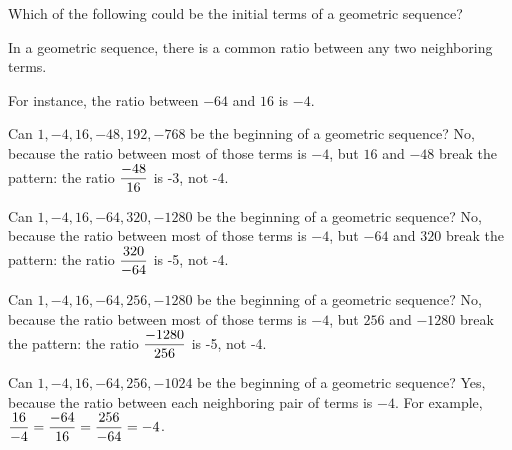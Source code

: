 \documentclass{ximera}
\begin{document}
\begin{question}
  Which of the following could be the initial terms of a geometric sequence?
              
    \begin{hint}
      In a geometric sequence, there is a common ratio between any two neighboring terms.
    \end{hint}
    \begin{hint}
      For instance, the ratio between $-64$ and $16$ is $-4$.
    \end{hint}
    \begin{hint}
      Can $1,  -4,  16,  -48,  192,  -768 $ be the beginning of a geometric sequence?  No, because the ratio between most of those terms is $-4$, but $16$ and $-48$ break the pattern: the ratio $\displaystyle\displaystyle\frac{-48}{16}$ is -3, not -4.
    \end{hint}
    \begin{hint}
      Can $1,  -4,  16,  -64,  320,  -1280 $ be the beginning of a geometric sequence?  No, because the ratio between most of those terms is $-4$, but $-64$ and $320$ break the pattern: the ratio $\displaystyle\displaystyle\frac{320}{-64}$ is -5, not -4.
    \end{hint}
    \begin{hint}
      Can $1,  -4,  16,  -64,  256,  -1280 $ be the beginning of a geometric sequence?  No, because the ratio between most of those terms is $-4$, but $256$ and $-1280$ break the pattern: the ratio $\displaystyle\displaystyle\frac{-1280}{256}$ is -5, not -4.
    \end{hint}
    \begin{hint}
      Can $1,  -4,  16,  -64,  256,  -1024 $ be the beginning of a geometric sequence?  Yes, because the ratio between each neighboring pair of terms is $-4$.  For example, 
      $\displaystyle\displaystyle\frac{16}{-4} = \displaystyle\displaystyle\frac{-64}{16} = \displaystyle\displaystyle\frac{256}{-64} = -4$.
    \end{hint}

    \begin{multipleChoice}
    \end{multipleChoice}


\end{question}
\end{document}
